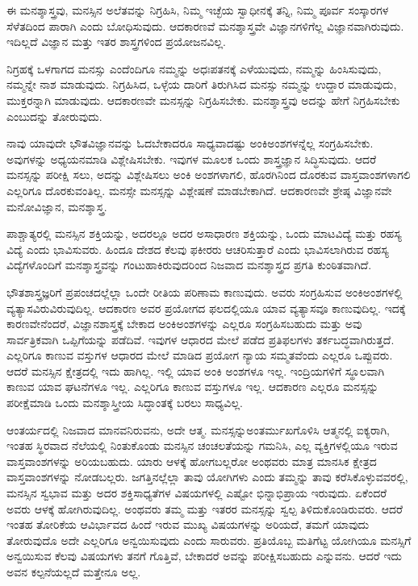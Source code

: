 ಈ ಮನಶ್ಶಾಸ್ತ್ರವು, ಮನಸ್ಸಿನ ಅಲೆತವನ್ನು ನಿಗ್ರಹಿಸಿ, ನಿಮ್ಮ ಇಚ್ಛೆಯ ಸ್ವಾಧೀನಕ್ಕೆ ತನ್ನಿ, ನಿಮ್ಮ ಪೂರ್ವ ಸಂಸ್ಕಾರಗಳ ಸೆಳೆತದಿಂದ ಪಾರಾಗಿ ಎಂದು ಬೋಧಿಸುವುದು. ಆದಕಾರಣವೆ ಮನಶ್ಶಾಸ್ತ್ರವೇ ವಿಜ್ಞಾನಗಳಿಗೆಲ್ಲ ವಿಜ್ಞಾನವಾಗಿರುವುದು. ಇದಿಲ್ಲದೆ ವಿಜ್ಞಾನ ಮತ್ತು ಇತರ ಶಾಸ್ತ್ರಗಳಿಂದ ಪ್ರಯೋಜನವಿಲ್ಲ.

ನಿಗ್ರಹಕ್ಕೆ ಒಳಗಾಗದ ಮನಸ್ಸು ಎಂದೆಂದಿಗೂ ನಮ್ಮನ್ನು ಅಧಃಪತನಕ್ಕೆ ಎಳೆಯುವುದು, ನಮ್ಮನ್ನು ಹಿಂಸಿಸುವುದು, ನಮ್ಮನ್ನೇ ನಾಶ ಮಾಡುವುದು. ನಿಗ್ರಹಿಸಿದ, ಒಳ್ಳೆಯ ದಾರಿಗೆ ತಿರುಗಿಸಿದ ಮನಸ್ಸು ನಮ್ಮನ್ನು ಉದ್ದಾರ ಮಾಡುವುದು, ಮುಕ್ತರನ್ನಾಗಿ ಮಾಡುವುದು. ಆದಕಾರಣವೇ ಮನಸ್ಸನ್ನು ನಿಗ್ರಹಿಸಬೇಕು. ಮನಶ್ಶಾಸ್ತ್ರವು ಅದನ್ನು ಹೇಗೆ ನಿಗ್ರಹಿಸಬೇಕು ಎಂಬುದನ್ನು ತೋರುವುದು.

ನಾವು ಯಾವುದೇ ಭೌತವಿಜ್ಞಾನವನ್ನು ಓದಬೇಕಾದರೂ ಸಾಧ್ಯವಾದಷ್ಟು ಅಂಕಿಅಂಶಗಳನ್ನೆಲ್ಲ ಸಂಗ್ರಹಿಸಬೇಕು. ಅವುಗಳನ್ನು ಅಧ್ಯಯನಮಾಡಿ ವಿಶ್ಲೇಷಿಸಬೇಕು. ಇವುಗಳ ಮೂಲಕ ಒಂದು ಶಾಸ್ತ್ರಜ್ಞಾನ ಸಿದ್ಧಿಸುವುದು. ಆದರೆ ಮನಸ್ಸನ್ನು ಪರೀಕ್ಷಿ ಸಲು, ಅದನ್ನು ವಿಶ್ಲೇಷಿಸಲು ಅಂಕಿ ಅಂಶಗಳಾಗಲಿ, ಹೊರಗಿನಿಂದ ದೊರಕುವ ವಾಸ್ತವಾಂಶಗಳಾಗಲಿ ಎಲ್ಲರಿಗೂ ದೊರಕುವಂತಿಲ್ಲ. ಮನಸ್ಸೇ ಮನಸ್ಸನ್ನು ವಿಶ್ಲೇಷಣೆ ಮಾಡಬೇಕಾಗಿದೆ. ಆದಕಾರಣವೇ ಶ್ರೇಷ್ಠ ವಿಜ್ಞಾನವೇ ಮನೋವಿಜ್ಞಾನ, ಮನಶ್ಶಾಸ್ತ್ರ.

ಪಾಶ್ಚಾತ್ಯರಲ್ಲಿ ಮನಸ್ಸಿನ ಶಕ್ತಿಯನ್ನು, ಅದರಲ್ಲೂ ಅದರ ಅಸಾಧಾರಣ ಶಕ್ತಿಯನ್ನು, ಒಂದು ಮಾಟವಿದ್ಯೆ ಮತ್ತು ರಹಸ್ಯ ವಿದ್ಯೆ ಎಂದು ಭಾವಿಸುವರು. ಹಿಂದೂ ದೇಶದ ಕೆಲವು ಫಕೀರರು ಆಚರಿಸುತ್ತಾರೆ ಎಂದು ಭಾವಿಸಲಾಗಿರುವ ರಹಸ್ಯ ವಿದ್ಯೆಗಳೊಂದಿಗೆ ಮನಶ್ಶಾಸ್ತ್ರವನ್ನು ಗಂಟುಹಾಕಿರುವುದರಿಂದ ನಿಜವಾದ ಮನಶ್ಶಾಸ್ತ್ರದ ಪ್ರಗತಿ ಕುಂಠಿತವಾಗಿದೆ.

ಭೌತಶಾಸ್ತ್ರಜ್ಞರಿಗೆ ಪ್ರಪಂಚದಲ್ಲೆಲ್ಲಾ ಒಂದೇ ರೀತಿಯ ಪರಿಣಾಮ ಕಾಣುವುದು. ಅವರು ಸಂಗ್ರಹಿಸುವ ಅಂಕಿಅಂಶಗಳಲ್ಲಿ ವ್ಯತ್ಯಾಸವಿರುವಿರುವುದಿಲ್ಲ. ಆದಕಾರಣ ಅವರ ಪ್ರಯೋಗದ ಫಲದಲ್ಲಿಯೂ ಯಾವ ವ್ಯತ್ಯಾಸವೂ ಕಾಣುವುದಿಲ್ಲ. ಇದಕ್ಕೆ ಕಾರಣವೇನೆಂದರೆ, ವಿಜ್ಞಾನಶಾಸ್ತ್ರಕ್ಕೆ ಬೇಕಾದ ಅಂಕಿಅಂಶಗಳನ್ನು ಎಲ್ಲರೂ ಸಂಗ್ರಹಿಸಬಹುದು ಮತ್ತು ಅವು ಸಾರ್ವತ್ರಿಕವಾಗಿ ಒಪ್ಪಿಗೆಯನ್ನು ಪಡೆದಿವೆ. ಇವುಗಳ ಆಧಾರದ ಮೇಲೆ ಪಡೆದ ಪ್ರತಿಫಲಗಳು ತರ್ಕಬದ್ಧವಾಗಿರುತ್ತದೆ. ಎಲ್ಲರಿಗೂ ಕಾಣುವ ವಸ್ತುಗಳ ಆಧಾರದ ಮೇಲೆ ಮಾಡಿದ ಪ್ರಯೋಗ ನ್ಯಾಯ ಸಮ್ಮತವೆಂದು ಎಲ್ಲರೂ ಒಪ್ಪುವರು. ಆದರೆ ಮನಸ್ಸಿನ ಕ್ಷೇತ್ರದಲ್ಲಿ ಇದು ಹಾಗಿಲ್ಲ. ಇಲ್ಲಿ ಯಾವ ಅಂಕಿ ಅಂಶಗಳೂ ಇಲ್ಲ. ಇಂದ್ರಿಯಗಳಿಗೆ ಸ್ಥೂಲವಾಗಿ ಕಾಣುವ ಯಾವ ಘಟನೆಗಳೂ ಇಲ್ಲ. ಎಲ್ಲರಿಗೂ ಕಾಣುವ ವಸ್ತುಗಳೂ ಇಲ್ಲ. ಆದಕಾರಣ ಎಲ್ಲರೂ ಮನಸ್ಸನ್ನು ಪರೀಕ್ಷೆಮಾಡಿ ಒಂದು ಮನಶ್ಶಾಸ್ತ್ರೀಯ ಸಿದ್ಧಾಂತಕ್ಕೆ ಬರಲು ಸಾಧ್ಯವಿಲ್ಲ.

\newpage

ಆಂತರ್ಯದಲ್ಲಿ ನಿಜವಾದ ಮಾನವನಿರುವನು, ಅದೇ ಆತ್ಮ. ಮನಸ್ಸನ್ನು\break ಅಂತರ್ಮುಖಗೊಳಿಸಿ ಆತ್ಮನಲ್ಲಿ ಐಕ್ಯರಾಗಿ, ಇಂತಹ ಸ್ಥಿರವಾದ ನೆಲೆಯಲ್ಲಿ ನಿಂತುಕೊಂಡು ಮನಸ್ಸಿನ ಚಂಚಲತೆಯನ್ನು ಗಮನಿಸಿ, ಎಲ್ಲ ವ್ಯಕ್ತಿಗಳಲ್ಲಿಯೂ ಇರುವ ವಾಸ್ತವಾಂಶಗಳನ್ನು ಅರಿಯಬಹುದು. ಯಾರು ಆಳಕ್ಕೆ ಹೋಗಬಲ್ಲರೋ ಅಂಥವರು ಮಾತ್ರ ಮಾನಸಿಕ ಕ್ಷೇತ್ರದ ವಾಸ್ತವಾಂಶಗಳನ್ನು ನೋಡಬಲ್ಲರು. ಜಗತ್ತಿನಲ್ಲೆಲ್ಲಾ ತಾವು ಯೋಗಿಗಳು ಎಂದು ತಮ್ಮನ್ನು ತಾವು ಕರೆಸಿಕೊಳ್ಳುವವರಲ್ಲಿ, ಮನಸ್ಸಿನ ಸ್ವಭಾವ ಮತ್ತು ಅದರ ಶಕ್ತಿಸಾಧ್ಯತೆಗಳ ವಿಷಯಗಳಲ್ಲಿ ಎಷ್ಟೋ ಭಿನ್ನಾಭಿಪ್ರಾಯ ಇರುವುದು. ಏಕೆಂದರೆ ಅವರು ಆಳಕ್ಕೆ ಹೋಗಿರುವುದಿಲ್ಲ. ಅಂಥವರು ತಮ್ಮ ಮತ್ತು ಇತರರ ಮನಸ್ಸನ್ನು ಸ್ವಲ್ಪ ತಿಳಿದುಕೊಂಡಿರುವರು. ಆದರೆ ಇಂತಹ ತೋರಿಕೆಯ ಆವಿರ್ಭಾವದ ಹಿಂದೆ ಇರುವ ಮುಖ್ಯ ವಿಷಯಗಳನ್ನು ಅರಿಯದೆ, ತಮಗೆ ಯಾವುದು ತೋರುವುದೊ ಅದೇ ಎಲ್ಲರಿಗೂ ಅನ್ವಯಿಸುವುದು ಎಂದು ಸಾರುವರು. ಪ್ರತಿಯೊಬ್ಬ ಮತಿಗೆಟ್ಟ ಯೋಗಿಯೂ ಮನಸ್ಸಿಗೆ ಅನ್ವಯಿಸುವ ಕೆಲವು ವಿಷಯಗಳು ತನಗೆ ಗೊತ್ತಿವೆ, ಬೇಕಾದರೆ ಅವನ್ನು ಪರೀಕ್ಷಿಸಬಹುದು ಎನ್ನುವನು. ಆದರೆ ಇದು ಅವನ ಕಲ್ಪನೆಯಲ್ಲದೆ ಮತ್ತೇನೂ ಅಲ್ಲ.

